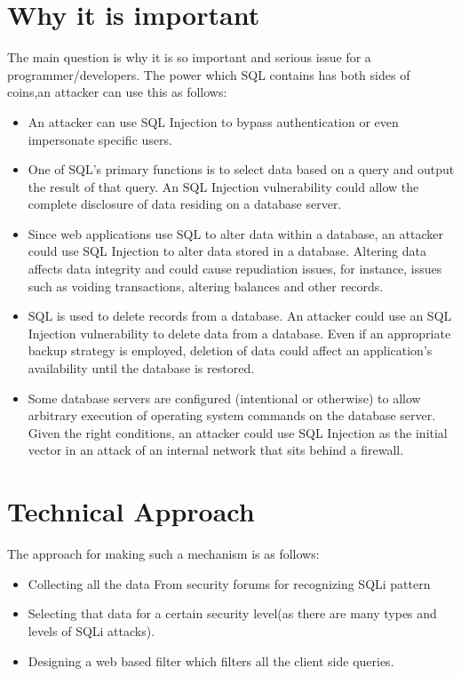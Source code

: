 \documentclass[journal]{IEEEtran}
\begin{document}
 \section{Why it is important}
 The main question is why it is so important and serious issue for a programmer/developers.
 The power which SQL contains has both sides of coins,an attacker can use this as follows:
 \begin{itemize}
     \item An attacker can use SQL Injection to bypass authentication or even impersonate specific users.
\item One of SQL’s primary functions is to select data based on a query and output the result of that query. An SQL Injection vulnerability could allow the complete disclosure of data residing on a database server.
\item Since web applications use SQL to alter data within a database, an attacker could use SQL Injection to alter data stored in a database. Altering data affects data integrity and could cause repudiation issues, for instance, issues such as voiding transactions, altering balances and other records.
\item SQL is used to delete records from a database. An attacker could use an SQL Injection vulnerability to delete data from a database. Even if an appropriate backup strategy is employed, deletion of data could affect an application’s availability until the database is restored.
\item Some database servers are configured (intentional or otherwise) to allow arbitrary execution of operating system commands on the database server. Given the right conditions, an attacker could use SQL Injection as the initial vector in an attack of an internal network that sits behind a firewall.
 \end{itemize}
 
\section{Technical Approach}
The approach for making such a mechanism is as follows:
\begin{itemize}
\item Collecting all the data From security forums for recognizing SQLi pattern
\item Selecting that data for a certain security level(as there are many types and levels of SQLi attacks). 
\item Designing a web based filter which filters all the client side queries.\cite{boyd2004sqlrand}
\end{itemize}
\end{document}
